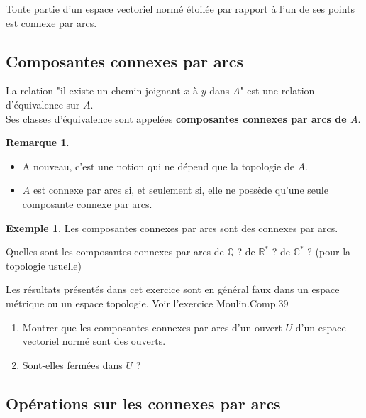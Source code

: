 \documentclass[french]{article}
\newcommand{\Q}{\mathbb{Q}}
\newcommand{\R}{\mathbb{R}}
\newcommand{\C}{\mathbb{C}}
\newcommand{\st}{^*}
\theoremstyle{plain}
\theoremstyle{definition}
\newtheorem*{ex}{Exemple}
\newtheorem*{rmq}{Remarque}
\theoremstyle{remark}
\begin{document}
\begin{prop}%
	Toute partie d'un espace vectoriel normé étoilée par rapport à l'un de ses points est connexe par arcs.
\end{prop}

\subsection{Composantes connexes par arcs}

\begin{prop}%
	La relation "il existe un chemin joignant $x$ à $y$ dans $A$" est une relation d'équivalence sur $A$.\\
	Ses classes d'équivalence sont appelées \textbf{composantes connexes par arcs de $A$}.
\end{prop}

\begin{rmq}
	\begin{itemize}
		\item A nouveau, c'est une notion qui ne dépend que la topologie de $A$.
		\item $A$ est connexe par arcs si, et seulement si, elle ne possède qu'une seule composante connexe par arcs.
	\end{itemize}
\end{rmq}

\begin{ex}
	Les composantes connexes par arcs sont des connexes par arcs.
\end{ex}

\begin{exo}
	Quelles sont les composantes connexes par arcs de $\Q$ ? de $\R\st$ ? de $\C\st$ ? (pour la topologie usuelle)
\end{exo}

\begin{exo}
	Les résultats présentés dans cet exercice sont en général faux dans un espace métrique ou un espace topologie. Voir l'exercice Moulin.Comp.39
	\begin{enumerate}
		\item Montrer que les composantes connexes par arcs d'un ouvert $U$ d'un espace vectoriel normé sont des ouverts.
		\item Sont-elles fermées dans $U$ ?
	\end{enumerate}
\end{exo}

\subsection{Opérations sur les connexes par arcs}
\end{document}
